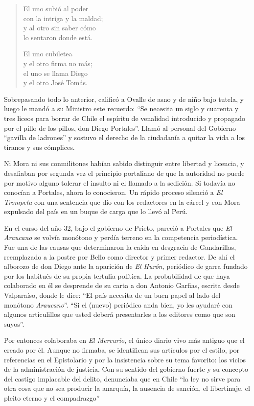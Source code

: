 \documentclass[10pt,twoside,openright]{memoir}
\begin{document}
\begin{verse}
El uno subió al poder\\
con la intriga y la maldad;\\
y al otro sin saber cómo\\
lo sentaron donde está.

El uno cubiletea\\
y el otro firma no más;\\
el uno se llama Diego\\
y el otro José Tomás.
\end{verse}

Sobrepasando todo lo anterior, calificó a Ovalle de asno y de niño bajo
tutela, y luego le mandó a su Ministro este recuerdo: ``Se necesita un
siglo y cuarenta y tres liceos para borrar de Chile el espíritu de
venalidad introducido y propagado por el pillo de los
pillos, don Diego Portales''. Llamó
al personal del Gobierno ``gavilla de ladrones'' y sostuvo el derecho de
la ciudadanía a quitar la vida a los tiranos y sus cómplices.

Ni Mora ni sus conmilitones habían sabido distinguir entre libertad y
licencia, y desafiaban por segunda vez el principio portaliano de que la
autoridad no puede por motivo alguno tolerar el insulto ni el llamado a
la sedición. Si todavía no conocían a Portales, ahora lo conocieron. Un
rápido proceso silenció a \emph{El Trompeta} con una sentencia que dio con los
redactores en la cárcel y con Mora expulsado del país en un buque de
carga que lo llevó al Perú.

En el curso del año 32, bajo el
gobierno de Prieto, pareció a Portales que \emph{El Araucano} se volvía
monótono y perdía terreno en la competencia periodística. Fue una de las
causas que determinaron la caída en desgracia de Gandarillas,
reemplazado a la postre por Bello como director y primer redactor. De
ahí el alborozo de don Diego ante la aparición de \emph{El Hurón}, periódico
de garra fundado por los habitués de su propia tertulia política. La
probabilidad de que haya colaborado en él se desprende de su carta a don
Antonio Garfias, escrita desde Valparaíso, donde le dice: ``El país
necesita de un buen papel al lado del monótono \emph{Araucano}''. ``Si el (nuevo)
periódico anda bien, yo les ayudaré con algunos articulillos que usted
deberá presentarles a los editores como que son suyos''.

Por entonces colaboraba en \emph{El Mercurio}, el único diario vivo más antiguo
que el creado por él. Aunque no firmaba, se identifican sus artículos
por el estilo, por referencias en el Epistolario y por la insistencia
sobre su tema favorito: los vicios de la administración de justicia. Con
su sentido del gobierno fuerte y su concepto del castigo implacable del
delito, denunciaba que en Chile ``la ley no sirve para otra cosa que no
sea producir la anarquía, la ausencia de sanción, el libertinaje, el
pleito eterno y el compadrazgo''
\end{document}
